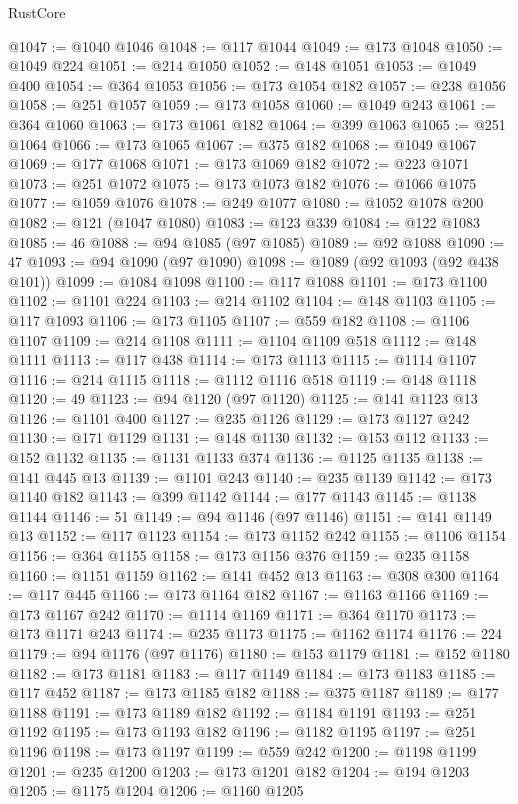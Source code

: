 \begin{lexlean}{RustCore}
\begin{coremodule}
@1047 := @1040 @1046
@1048 := @117 @1044
@1049 := @173 @1048
@1050 := @1049 @224
@1051 := @214 @1050
@1052 := @148 @1051
@1053 := @1049 @400
@1054 := @364 @1053
@1056 := @173 @1054 @182
@1057 := @238 @1056
@1058 := @251 @1057
@1059 := @173 @1058
@1060 := @1049 @243
@1061 := @364 @1060
@1063 := @173 @1061 @182
@1064 := @399 @1063
@1065 := @251 @1064
@1066 := @173 @1065
@1067 := @375 @182
@1068 := @1049 @1067
@1069 := @177 @1068
@1071 := @173 @1069 @182
@1072 := @223 @1071
@1073 := @251 @1072
@1075 := @173 @1073 @182
@1076 := @1066 @1075
@1077 := @1059 @1076
@1078 := @249 @1077
@1080 := @1052 @1078 @200
@1082 := @121 (@1047 @1080)
@1083 := @123 @339
@1084 := @122 @1083
@1085 := 46
@1088 := @94 @1085 (@97 @1085)
@1089 := @92 @1088
@1090 := 47
@1093 := @94 @1090 (@97 @1090)
@1098 := @1089 (@92 @1093 (@92 @438 @101))
@1099 := @1084 @1098
@1100 := @117 @1088
@1101 := @173 @1100
@1102 := @1101 @224
@1103 := @214 @1102
@1104 := @148 @1103
@1105 := @117 @1093
@1106 := @173 @1105
@1107 := @559 @182
@1108 := @1106 @1107
@1109 := @214 @1108
@1111 := @1104 @1109 @518
@1112 := @148 @1111
@1113 := @117 @438
@1114 := @173 @1113
@1115 := @1114 @1107
@1116 := @214 @1115
@1118 := @1112 @1116 @518
@1119 := @148 @1118
@1120 := 49
@1123 := @94 @1120 (@97 @1120)
@1125 := @141 @1123 @13
@1126 := @1101 @400
@1127 := @235 @1126
@1129 := @173 @1127 @242
@1130 := @171 @1129
@1131 := @148 @1130
@1132 := @153 @112
@1133 := @152 @1132
@1135 := @1131 @1133 @374
@1136 := @1125 @1135
@1138 := @141 @445 @13
@1139 := @1101 @243
@1140 := @235 @1139
@1142 := @173 @1140 @182
@1143 := @399 @1142
@1144 := @177 @1143
@1145 := @1138 @1144
@1146 := 51
@1149 := @94 @1146 (@97 @1146)
@1151 := @141 @1149 @13
@1152 := @117 @1123
@1154 := @173 @1152 @242
@1155 := @1106 @1154
@1156 := @364 @1155
@1158 := @173 @1156 @376
@1159 := @235 @1158
@1160 := @1151 @1159
@1162 := @141 @452 @13
@1163 := @308 @300
@1164 := @117 @445
@1166 := @173 @1164 @182
@1167 := @1163 @1166
@1169 := @173 @1167 @242
@1170 := @1114 @1169
@1171 := @364 @1170
@1173 := @173 @1171 @243
@1174 := @235 @1173
@1175 := @1162 @1174
@1176 := 224
@1179 := @94 @1176 (@97 @1176)
@1180 := @153 @1179
@1181 := @152 @1180
@1182 := @173 @1181
@1183 := @117 @1149
@1184 := @173 @1183
@1185 := @117 @452
@1187 := @173 @1185 @182
@1188 := @375 @1187
@1189 := @177 @1188
@1191 := @173 @1189 @182
@1192 := @1184 @1191
@1193 := @251 @1192
@1195 := @173 @1193 @182
@1196 := @1182 @1195
@1197 := @251 @1196
@1198 := @173 @1197
@1199 := @559 @242
@1200 := @1198 @1199
@1201 := @235 @1200
@1203 := @173 @1201 @182
@1204 := @194 @1203
@1205 := @1175 @1204
@1206 := @1160 @1205

\end{coremodule}
\end{lexlean}
